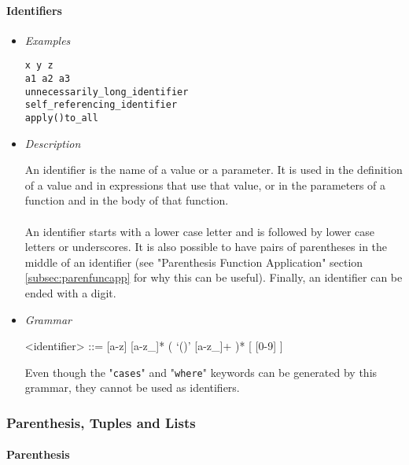 \documentclass{article}
\begin{document}
\paragraph{Identifiers}
\begin{itemize}

\item \textit{Examples}
\begin{verbatim}
x y z
a1 a2 a3 
unnecessarily_long_identifier
self_referencing_identifier 
apply()to_all
\end{verbatim}

\item \textit{Description}

An identifier is the name of a value or a parameter. It is used in the
definition of a value and in expressions that use that value, or in the
parameters of a function and in the body of that function.
\\\\
An identifier starts with a lower case letter and is followed by lower case
letters or underscores. It is also possible to have pairs of parentheses in the
middle of an identifier (see "Parenthesis Function Application" section
\ref{subsec:parenfuncapp} for why this can be useful).  Finally, an identifier
can be ended with a digit.

\item \textit{Grammar}
\begin{grammar}
<identifier> ::= [a-z] [a-z_]* ( `()' [a-z_]+ )* [ [0-9] ]
\end{grammar}
Even though the "\texttt{cases}" and "\texttt{where}" keywords can be generated
by this grammar, they cannot be used as identifiers.

\end{itemize}

\newpage
\subsubsection{Parenthesis, Tuples and Lists}

\paragraph{Parenthesis}
\end{document}
